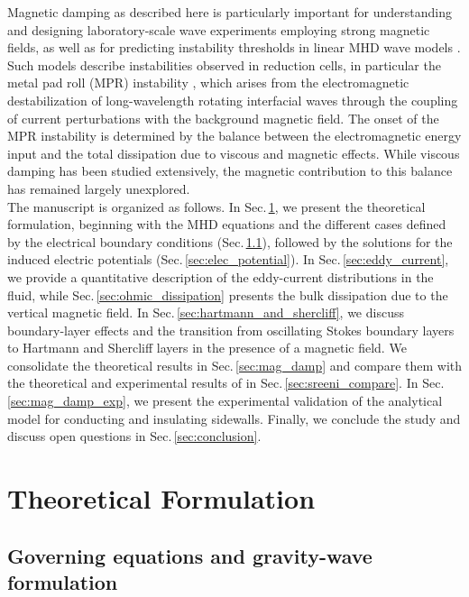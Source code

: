 \documentclass[aps,prfluids,reprint,superscriptaddress]{revtex4-2}
\begin{document}
\indent Magnetic damping as described here is particularly important for understanding and designing laboratory-scale wave experiments employing strong magnetic fields, as well as for predicting instability thresholds in linear MHD wave models \cite{Pedchenko2009, Pedcenko2017, Grants2021, Hegde2025, Hegde2026}. Such models describe instabilities observed in reduction cells, in particular the metal pad roll (MPR) instability \cite{Bojarevics1994,Davidson1998,Hegde2026}, which arises from the electromagnetic destabilization of long-wavelength rotating interfacial waves through the coupling of current perturbations with the background magnetic field. The onset of the MPR instability is determined by the balance between the electromagnetic energy input and the total dissipation due to viscous and magnetic effects. While viscous damping has been studied extensively, the magnetic contribution to this balance has remained largely unexplored.
\\
\indent The manuscript is organized as follows. In Sec.\,\ref{sec:theory}, we present the theoretical formulation, beginning with the MHD equations and the different cases defined by the electrical boundary conditions (Sec.\,\ref{sec:gov_eqs}), followed by the solutions for the induced electric potentials (Sec.\,\ref{sec:elec_potential}). In Sec.\,\ref{sec:eddy_current}, we provide a quantitative description of the eddy-current distributions in the fluid, while Sec.\,\ref{sec:ohmic_dissipation} presents the bulk dissipation due to the vertical magnetic field. In Sec.\,\ref{sec:hartmann_and_shercliff}, we discuss boundary-layer effects and the transition from oscillating Stokes boundary layers to Hartmann and Shercliff layers in the presence of a magnetic field. We consolidate the theoretical results in Sec.\,\ref{sec:mag_damp} and compare them with the theoretical and experimental results of \citet{Sreenivasan2005} in Sec.\,\ref{sec:sreeni_compare}. In Sec.\,\ref{sec:mag_damp_exp}, we present the experimental validation of the analytical model for conducting and insulating sidewalls. Finally, we conclude the study and discuss open questions in Sec.\,\ref{sec:conclusion}.


\section{Theoretical Formulation}
\label{sec:theory}

\subsection{Governing equations and gravity-wave formulation} \label{sec:gov_eqs}
\end{document}
